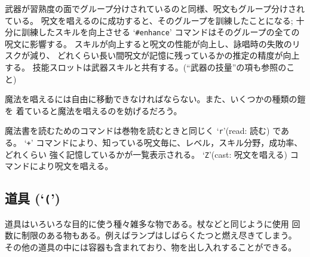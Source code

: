 武器が習熟度の面でグループ分けされているのと同様、呪文もグループ分けされている。
呪文を唱えるのに成功すると、そのグループを訓練したことになる;
十分に訓練したスキルを向上させる `{\tt \#enhance}' コマンドはそのグループの全ての
呪文に影響する。
スキルが向上すると呪文の性能が向上し、詠唱時の失敗のリスクが減り、
どれくらい長い間呪文が記憶に残っているかの推定の精度が向上する。
技能スロットは武器スキルと共有する。(``武器の技量''の項も参照のこと)

魔法を唱えるには自由に移動できなければならない。また、いくつかの種類の鎧を
着ていると魔法を唱えるのを妨げるだろう。

魔法書を読むためのコマンドは巻物を読むときと同じく `{\tt r}'(read: 読む) である。
`{\tt +}' コマンドにより、知っている呪文毎に、レベル，スキル分野，成功率、どれくらい
強く記憶しているかが一覧表示される。
`{\tt Z}'(cast: 呪文を唱える) コマンドにより呪文を唱える。

\subsection*{道具 (`{\tt (}')}

道具はいろいろな目的に使う種々雑多な物である。杖などと同じように使用
回数に制限のある物もある。例えばランプはしばらくたつと燃え尽きてしまう。
その他の道具の中には容器も含まれており、物を出し入れすることができる。

